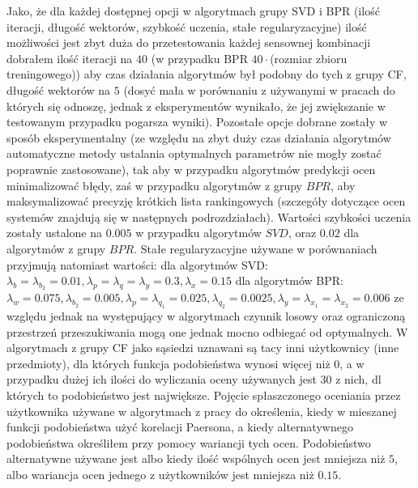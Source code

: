 \documentclass{pracamgr}
\begin{document}
   Jako, że dla każdej dostępnej opcji w algorytmach grupy SVD i BPR (ilość iteracji, długość wektorów, szybkość uczenia, stałe regularyzacyjne)
   ilość możliwości jest zbyt duża do przetestowania każdej sensownej kombinacji dobrałem ilość iteracji na $40$
   (w przypadku BPR $40\cdot$(rozmiar zbioru treningowego)) aby czas działania algorytmów był podobny do tych z grupy CF, długość wektorów na $5$
   (dosyć mała w porównaniu z używanymi w pracach do których się odnoszę, jednak z eksperymentów wynikało, że jej zwiększanie w testowanym przypadku
   pogarsza wyniki). Pozostałe opcje dobrane zostały w sposób eksperymentalny
   (ze względu na zbyt duży czas działania algorytmów automatyczne metody ustalania optymalnych parametrów nie mogły zostać poprawnie zastosowane),
   tak aby w przypadku algorytmów predykcji ocen minimalizować błędy, zaś w przypadku algorytmów z grupy $BPR$, aby maksymalizować precyzję
   krótkich lista rankingowych (szczegóły dotyczące ocen systemów znajdują się w następnych podrozdziałach).
   Wartości szybkości uczenia zostały ustalone na $0.005$ w przypadku algorytmów $SVD$, oraz $0.02$ dla algorytmów z grupy $BPR$.
   Stałe regularyzacyjne używane w porównaniach przyjmują natomiast wartości:\newline
   dla algorytmów SVD:\newline
   $\lambda_b=\lambda_{b_2}=0.01,\lambda_p=\lambda_q=\lambda_y=0.3,\lambda_x=0.15$\newline
   dla algorytmów BPR:\newline
   $\lambda_w=0.075,\lambda_{b_2}=0.005,\lambda_p=\lambda_{q_1}=0.025,\lambda_{q_2}=0.0025,\lambda_y=\lambda_{x_1}=\lambda_{x_2}=0.006$\newline
   ze względu jednak na występujący w algorytmach czynnik losowy oraz ograniczoną przestrzeń przeszukiwania mogą one jednak mocno odbiegać od optymalnych.\newline
   W algorytmach z grupy CF jako sąsiedzi uznawani są tacy inni użytkownicy (inne przedmioty), dla których funkcja podobieństwa wynosi więcej niż $0$,
   a w przypadku dużej ich ilości do wyliczania oceny używanych jest $30$ z nich, dl których to podobieństwo jest największe. 
   Pojęcie spłaszczonego oceniania przez użytkownika używane w algorytmach z pracy \cite{221} do określenia,
   kiedy w mieszanej funkcji podobieństwa użyć korelacji Paersona, a kiedy alternatywnego podobieństwa określiłem przy pomocy wariancji tych ocen.
   Podobieństwo alternatywne używane jest albo kiedy ilość wspólnych ocen jest mniejsza niż $5$, albo wariancja ocen jednego z użytkowników jest mniejsza niż $0.15$.\newline
\end{document}
